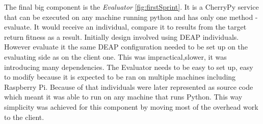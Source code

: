 The final big component is the \textit{Evaluator} \ref{fig:firstSprint}. It is a CherryPy service that can be executed on any machine running python and
 has only one method - evaluate. It would receive an individual, compare it to results from the target return fitness as a result. Initially design involved using DEAP individuals.
However evaluate it the same DEAP configuration needed to be set up on the evaluating side as on the client one.
This was impractical,slower, it was introducing many dependencies. The Evaluator needs
to be easy to set up, easy to modify because it is expected to be ran on multiple machines including Raspberry Pi.
Because of that individuals were later represented as source code which meant it was able to run on any machine
that runs Python. This way simplicity was achieved for this component by moving most of the overhead work to the client.
